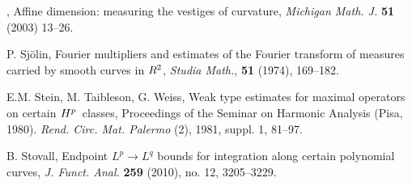 \documentclass[11 pt]{amsart}
\theoremstyle{plain}
\numberwithin{equation}{section}
\theoremstyle{plain}
\numberwithin{equation}{section}
\theoremstyle{remark}
\begin{document}
\begin{thebibliography}{99999}
\bysame, Affine dimension: measuring the vestiges of curvature,
\textit{Michigan Math. J.} {{\bf {51}}} (2003) 13--26.

 P. Sj\"olin,
Fourier multipliers and estimates of the Fourier transform of measures carried by smooth curves in $R\sp{2}$, \textit{Studia Math.}, {{\bf {51}}} (1974), 169--182.

 E.M. Stein, M. Taibleson, G. Weiss, Weak type estimates for maximal operators on certain
$H\sp{p}$\ classes, Proceedings of the Seminar on Harmonic Analysis (Pisa, 1980). \textit{Rend. Circ. Mat. Palermo} (2), 1981,  suppl. 1, 81--97.

 B. Stovall, Endpoint $L^p\to L^q$ bounds for integration along certain polynomial curves, \textit{J. Funct. Anal.} {{\bf {259}}} (2010), no. 12, 3205--3229.
\end{thebibliography}
\end{document}
